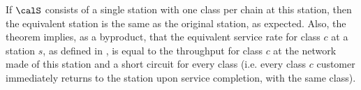  If
 $\calS$ consists of a single station with one
 class per chain at this station, then the
 equivalent station is the same as the original station,
 as expected. Also, the theorem implies, as a byproduct,
 that the equivalent service rate for class $c$ at a
  station $s$, as defined in ,
is equal to the throughput for class $c$ at the
network made of this station and a short circuit
for every class (i.e. every class $c$ customer
immediately returns to the station upon service
completion, with the same class).
 \begin{figure}
\centering
 ~\\
 \vspace{1cm}
  \label{fig-q-qnet-sdflfdlkjbnfiouzgb}
\end{figure}

